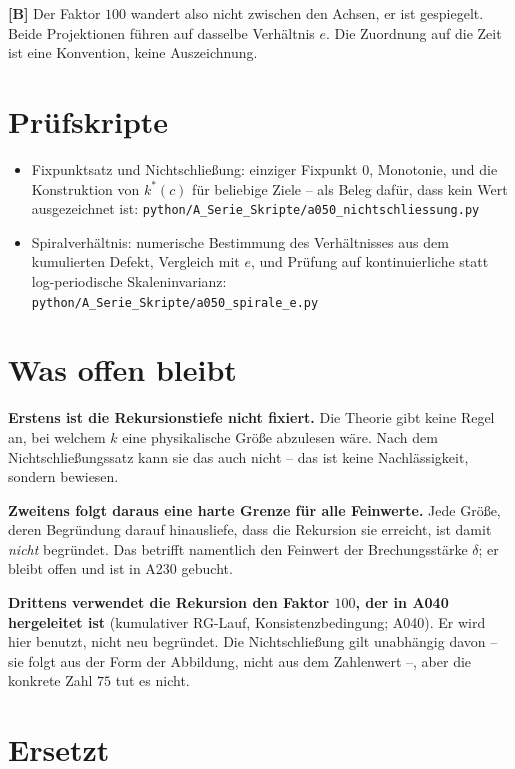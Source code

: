 \textbf{[B]} Der Faktor $100$ wandert also nicht zwischen den Achsen, er ist
gespiegelt. Beide Projektionen führen auf dasselbe Verhältnis $e$. Die
Zuordnung auf die Zeit ist eine Konvention, keine Auszeichnung.

\section{Prüfskripte}

\begin{itemize}
  \item Fixpunktsatz und Nichtschließung: einziger Fixpunkt $0$, Monotonie,
    und die Konstruktion von $k^*(c)$ für beliebige Ziele -- als Beleg dafür,
    dass kein Wert ausgezeichnet ist:
    \texttt{python/A\_Serie\_Skripte/a050\_nichtschliessung.py}
  \item Spiralverhältnis: numerische Bestimmung des Verhältnisses aus dem
    kumulierten Defekt, Vergleich mit $e$, und Prüfung auf kontinuierliche
    statt log-periodische Skaleninvarianz:
    \texttt{python/A\_Serie\_Skripte/a050\_spirale\_e.py}
\end{itemize}

\section{Was offen bleibt}

\textbf{Erstens ist die Rekursionstiefe nicht fixiert.} Die Theorie gibt keine
Regel an, bei welchem $k$ eine physikalische Größe abzulesen wäre. Nach dem
Nichtschließungssatz kann sie das auch nicht -- das ist keine Nachlässigkeit,
sondern bewiesen.

\textbf{Zweitens folgt daraus eine harte Grenze für alle Feinwerte.} Jede Größe,
deren Begründung darauf hinausliefe, dass die Rekursion sie erreicht, ist damit
\emph{nicht} begründet. Das betrifft namentlich den Feinwert der
Brechungsstärke $\delta$; er bleibt offen und ist in A230 gebucht.

\textbf{Drittens verwendet die Rekursion den Faktor $100$, der in A040
hergeleitet ist} (kumulativer RG-Lauf, Konsistenzbedingung; A040). Er wird
hier benutzt, nicht neu begründet. Die Nichtschließung gilt unabhängig davon --
sie folgt aus der Form der Abbildung, nicht aus dem Zahlenwert --, aber die
konkrete Zahl $75$ tut es nicht.

\section{Ersetzt}

